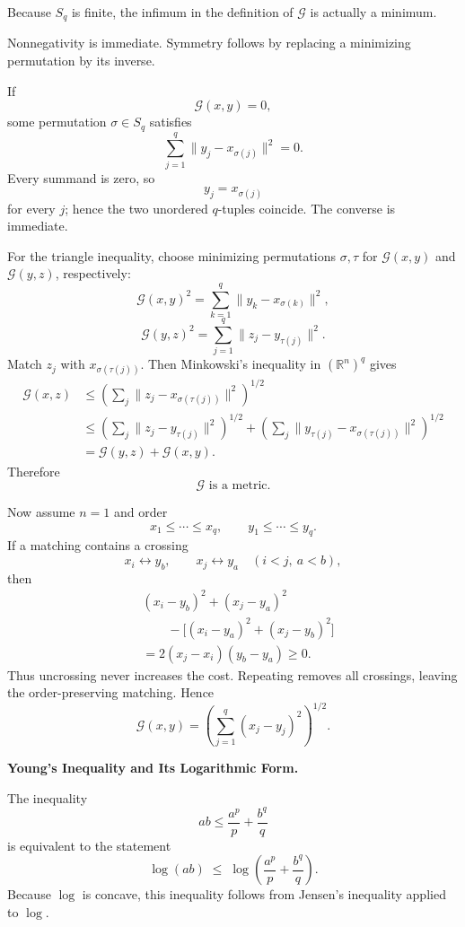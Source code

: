 \begin{solution}
Because \(S_q\) is finite, the infimum in the definition of \(\mathcal G\) is actually a
minimum.

Nonnegativity is immediate. Symmetry follows by replacing a minimizing permutation by its
inverse.

If
\[
\mathcal G(x,y)=0,
\]
some permutation \(\sigma\in S_q\) satisfies
\[
\sum_{j=1}^q
\|y_j-x_{\sigma(j)}\|^2=0.
\]
Every summand is zero, so
\[
y_j=x_{\sigma(j)}
\]
for every \(j\); hence the two unordered \(q\)-tuples coincide. The converse is immediate.

For the triangle inequality, choose minimizing permutations \(\sigma,\tau\) for
\(\mathcal G(x,y)\) and \(\mathcal G(y,z)\), respectively:
\[
\mathcal G(x,y)^2
=
\sum_{k=1}^q
\|y_k-x_{\sigma(k)}\|^2,
\]
\[
\mathcal G(y,z)^2
=
\sum_{j=1}^q
\|z_j-y_{\tau(j)}\|^2.
\]
Match \(z_j\) with \(x_{\sigma(\tau(j))}\). Then Minkowski's inequality in
\((\mathbb R^n)^q\) gives
\[
\begin{aligned}
\mathcal G(x,z)
&\le
\left(
\sum_j
\|z_j-x_{\sigma(\tau(j))}\|^2
\right)^{1/2}\\
&\le
\left(
\sum_j
\|z_j-y_{\tau(j)}\|^2
\right)^{1/2}
+
\left(
\sum_j
\|y_{\tau(j)}-x_{\sigma(\tau(j))}\|^2
\right)^{1/2}\\
&=
\mathcal G(y,z)+\mathcal G(x,y).
\end{aligned}
\]
Therefore
\[
\boxed{\mathcal G\text{ is a metric}.}
\]

Now assume \(n=1\) and order
\[
x_1\le\cdots\le x_q,
\qquad
y_1\le\cdots\le y_q.
\]
If a matching contains a crossing
\[
x_i\leftrightarrow y_b,
\qquad
x_j\leftrightarrow y_a
\quad(i<j,\ a<b),
\]
then
\[
\begin{aligned}
&(x_i-y_b)^2+(x_j-y_a)^2\\
&\qquad-
\bigl[(x_i-y_a)^2+(x_j-y_b)^2\bigr]\\
&=
2(x_j-x_i)(y_b-y_a)\ge0.
\end{aligned}
\]
Thus uncrossing never increases the cost. Repeating removes all crossings, leaving the
order-preserving matching. Hence
\[
\boxed{
\mathcal G(x,y)
=
\left(
\sum_{j=1}^q
(x_j-y_j)^2
\right)^{1/2}.
}
\]
\end{solution}


\begin{problem}[CP-II-0027]
\label{prob:cp-ii-0027}
\textbf{Young's Inequality and Its Logarithmic Form.}

\hspace*{1.5em}The inequality
	\[
	ab \le \frac{a^p}{p} + \frac{b^q}{q}
	\]
	is equivalent to the statement
	\[
	\log(ab)
	\;\le\;
	\log\!\left(\frac{a^p}{p} + \frac{b^q}{q}\right).
	\]
	Because $\log$ is concave, this inequality follows from Jensen's
	inequality applied to $\log$.
\end{problem}

